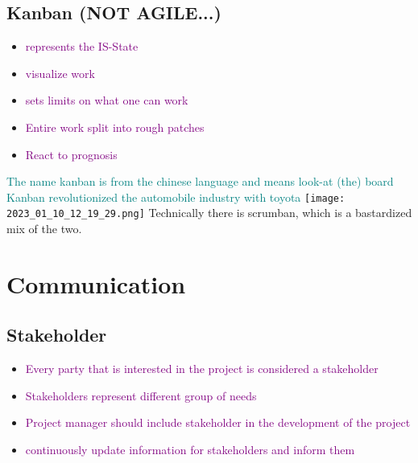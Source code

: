 \documentclass[main.tex,fontsize=12pt,paper=a4,paper=landscape,DIV=calc,]{scrartcl}
\begin{document}
\begin{multicols*}{2}
\subsection{Kanban (NOT AGILE...)}
\begin{itemize}
\item \textcolor{purple}{represents the IS-State}
\item \textcolor{purple}{visualize work}
\item \textcolor{purple}{sets limits on what one can work}
\item \textcolor{purple}{Entire work split into rough patches}
\item \textcolor{purple}{React to prognosis}
\end{itemize} 
\textcolor{teal}{The name kanban is from the chinese language and means look-at (the) board}\newline
\textcolor{teal}{Kanban revolutionized the automobile industry with toyota}\newline
\texttt{[image: 2023\_01\_10\_12\_19\_29.png]}\newline
Technically there is scrumban, which is a bastardized mix of the two.

\section{Communication}
\subsection{Stakeholder}
\begin{itemize}
\item \textcolor{purple}{Every party that is interested in the project is considered a stakeholder}
\item \textcolor{purple}{Stakeholders represent different group of needs}
\item \textcolor{purple}{Project manager should include stakeholder in the development of the project}
\item \textcolor{purple}{continuously update information for stakeholders and inform them}
\end{itemize} 


\end{multicols*}
\end{document}
